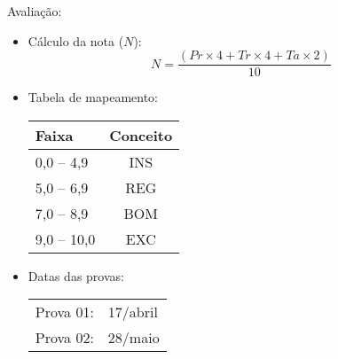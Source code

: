       \begin{slide}[toc=]{Avaliação:}
         \begin{itemize}
        \item Cálculo da nota ($N$):
            \begin{equation*}
	    N=\frac{( Pr \times 4 + Tr \times 4 + Ta \times 2 )} {10}
            \end{equation*}
          \item Tabela de mapeamento:
            \begin{table}
               \centering
               \begin{tabular}{lc}
                  \hline
                  \textbf{Faixa} & \textbf{Conceito}\\
                  \hline
                  0,0 -- 4,9 & INS\\
                  5,0 -- 6,9 & REG\\
                  7,0 -- 8,9 & BOM\\
                  9,0 -- 10,0 & EXC\\
                  \hline
               \end{tabular}
            \end{table}
      \item Datas das provas:
            \begin{table}
               \centering
               \begin{tabular}{|l l|}
                  \hline
                  Prova 01: & 17/abril\\
                  Prova 02: & 28/maio\\
                  \hline
               \end{tabular}
            \end{table}
         \end{itemize}
      \end{slide}

